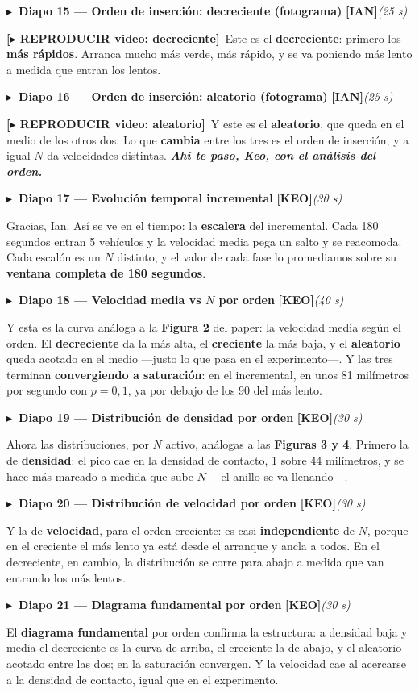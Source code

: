 \documentclass[11pt,a4paper]{article}
\newcommand{\diapo}[5]{%
  \medskip\par\noindent
  \textcolor{#4}{\textbf{$\blacktriangleright$\ Diapo #1 --- #2}}\quad
  \textcolor{#4}{\textbf{[#3]}}\hfill{\itshape\small(#5)}\par\nobreak\smallskip
}
\newcommand{\relevo}[1]{\hfill\textbf{\itshape #1}}
\newcommand{\videocue}[1]{\textcolor{cian!85!black}{\textbf{[$\blacktriangleright$ REPRODUCIR video: #1]}}\ }
\begin{document}
\diapo{15}{Orden de inserción: decreciente (fotograma)}{IAN}{cian}{25 s}
\videocue{decreciente}Este es el \textbf{decreciente}: primero los \textbf{más rápidos}. Arranca mucho más verde,
más rápido, y se va poniendo más lento a medida que entran los lentos.

\diapo{16}{Orden de inserción: aleatorio (fotograma)}{IAN}{cian}{25 s}
\videocue{aleatorio}Y este es el \textbf{aleatorio}, que queda en el medio de los otros dos. Lo que \textbf{cambia}
entre los tres es el orden de inserción, y a igual $N$ da velocidades distintas. \relevo{Ahí te paso, Keo, con el
análisis del orden.}

\diapo{17}{Evolución temporal incremental}{KEO}{ckeo}{30 s}
Gracias, Ian. Así se ve en el tiempo: la \textbf{escalera} del incremental. Cada 180 segundos entran 5 vehículos
y la velocidad media pega un salto y se reacomoda. Cada escalón es un $N$ distinto, y el valor de cada fase lo
promediamos sobre su \textbf{ventana completa de 180 segundos}.

\diapo{18}{Velocidad media vs $N$ por orden}{KEO}{ckeo}{40 s}
Y esta es la curva análoga a la \textbf{Figura 2} del paper: la velocidad media según el orden. El
\textbf{decreciente} da la más alta, el \textbf{creciente} la más baja, y el \textbf{aleatorio} queda acotado en
el medio ---justo lo que pasa en el experimento---. Y las tres terminan \textbf{convergiendo a saturación}: en el
incremental, en unos 81 milímetros por segundo con $p=0{,}1$, ya por debajo de los 90 del más lento.

\diapo{19}{Distribución de densidad por orden}{KEO}{ckeo}{30 s}
Ahora las distribuciones, por $N$ activo, análogas a las \textbf{Figuras 3 y 4}. Primero la de \textbf{densidad}:
el pico cae en la densidad de contacto, 1 sobre 44 milímetros, y se hace más marcado a medida que sube $N$ ---el
anillo se va llenando---.

\diapo{20}{Distribución de velocidad por orden}{KEO}{ckeo}{30 s}
Y la de \textbf{velocidad}, para el orden creciente: es casi \textbf{independiente} de $N$, porque en el creciente
el más lento ya está desde el arranque y ancla a todos. En el decreciente, en cambio, la distribución se corre
para abajo a medida que van entrando los más lentos.

\diapo{21}{Diagrama fundamental por orden}{KEO}{ckeo}{30 s}
El \textbf{diagrama fundamental} por orden confirma la estructura: a densidad baja y media el decreciente es la
curva de arriba, el creciente la de abajo, y el aleatorio acotado entre las dos; en la saturación convergen. Y la
velocidad cae al acercarse a la densidad de contacto, igual que en el experimento.
\end{document}
